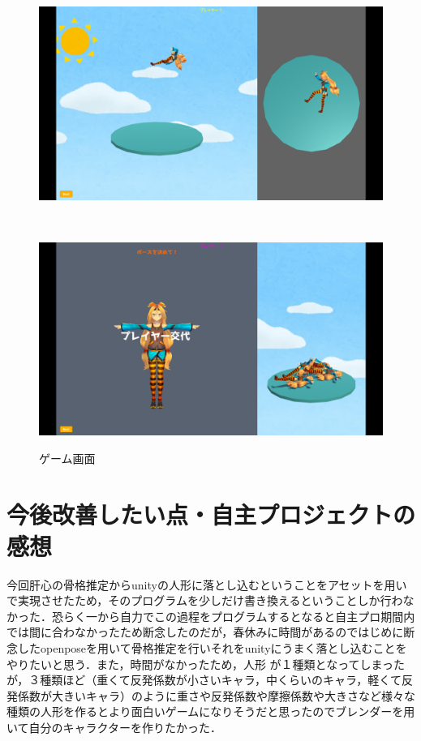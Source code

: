 \documentclass[uplatex,titlepage]{jsarticle}
\begin{document}
 \begin{figure}
 \begin{minipage}[b]{0.5\linewidth}
  \centering
  \includegraphics[keepaspectratio, scale=0.2]
  {images/game3.png}
  \label{position2}
 \end{minipage}
 \\
 \begin{minipage}[b]{0.5\linewidth}
  \centering
  \includegraphics[keepaspectratio, scale=0.2]
  {images/game5.png}
  \label{tumi}
 \end{minipage}
 \caption{ゲーム画面}\label{game}
\end{figure}



\section{今後改善したい点・自主プロジェクトの感想}
今回肝心の骨格推定からunityの人形に落とし込むということをアセットを用いで実現させたため，そのプログラムを少しだけ書き換えるということしか行わなかった．恐らく一から自力でこの過程をプログラムするとなると自主プロ期間内では間に合わなかったため断念したのだが，春休みに時間があるのではじめに断念したopenposeを用いて骨格推定を行いそれをunityにうまく落とし込むことをやりたいと思う．また，時間がなかったため，人形
が１種類となってしまったが，３種類ほど（重くて反発係数が小さいキャラ，中くらいのキャラ，軽くて反発係数が大きいキャラ）のように重さや反発係数や摩擦係数や大きさなど様々な種類の人形を作るとより面白いゲームになりそうだと思ったのでブレンダーを用いて自分のキャラクターを作りたかった．
\end{document}
